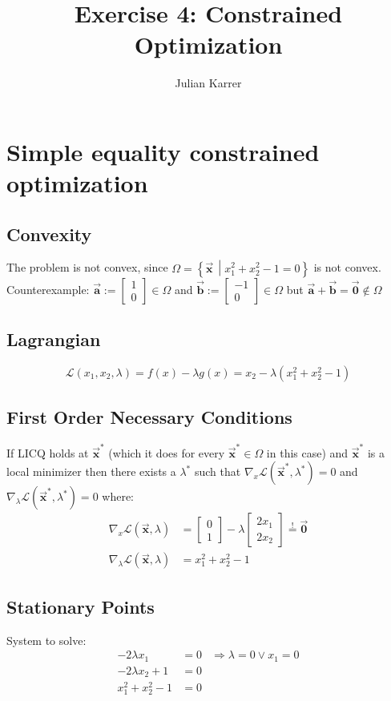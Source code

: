 \documentclass[oneside, a4paper]{book}
\author{Julian Karrer}
\title{Exercise 4: Constrained Optimization}
\newcommand\vek[1]{\vec{\bm{#1}}}
\newcommand\br[1]{\left(#1\right)}
\begin{document}
\chapter{Simple equality constrained optimization}
\section{Convexity}
The problem is not convex, since $\Omega = \left\{ \vek{x} \,\middle | x_1^2+x_2^2-1=0 \right\}$ is not convex. \\
Counterexample: $\vek{a}:=\begin{bmatrix}1\\0\end{bmatrix}\in\Omega$ and $\vek{b}:=\begin{bmatrix}-1\\0\end{bmatrix}\in\Omega$ but $\vek{a}+\vek{b}=\vek{0}\notin\Omega$


\section{Lagrangian}
\[
  \mathcal{L}\br{x_1, x_2,\lambda} = f(x) - \lambda g(x) = x_2 -\lambda\br{x_1^2+x_2^2-1}
\]
\section{First Order Necessary Conditions}
If LICQ holds at $\vek{x}^*$ (which it does for every $\vek{x}^*\in\Omega$ in this case) and $\vek{x}^*$ is a local minimizer then there exists a $\lambda^*$ such that $\nabla_x\mathcal{L}(\vek{x}^*, \lambda^*) = 0$ and $\nabla_\lambda\mathcal{L}(\vek{x}^*, \lambda^*)  = 0$ where:
\begin{align*}
    \nabla_x\mathcal{L}(\vek{x}, \lambda) &= \begin{bmatrix}0\\1\end{bmatrix} -\lambda\begin{bmatrix}2x_1\\2x_2\end{bmatrix} \overset{!}{=} \vek{0}\\
    \nabla_\lambda\mathcal{L}(\vek{x}, \lambda) &= x_1^2+x_2^2-1
\end{align*}
\section{Stationary Points}
System to solve:
\begin{align*}
  -2\lambda x_1 &= 0 & \Longrightarrow \lambda = 0 \lor x_1=0\\
  -2\lambda x_2 +1 &= 0 &\\
  x_1^2 + x_2^2 - 1 &= 0 &
\end{align*}
\end{document}
